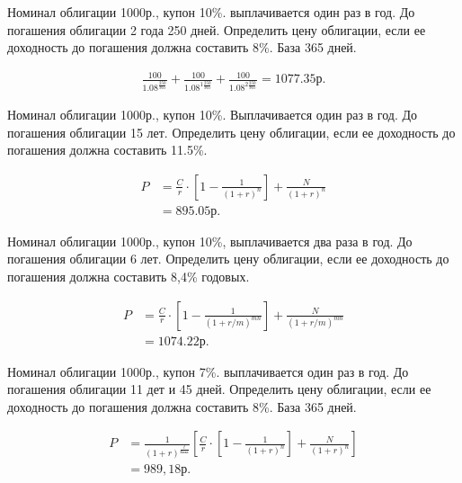 \documentclass[12pt, table, a4paper,twoside]{exam}
\begin{document}
\begin{questions}
\begin{solution}[12em]
\end{solution}



\question[10] Номинал облигации 1000р., купон 10\%. выплачивается один раз в год. До погашения облигации 2 года 250 дней. Определить цену облигации, если ее доходность до погашения должна составить 8\%. База 365 дней.

\begin{solution}[12em]
	\begin{align}
	\frac{100}{1.08^{\frac{250}{365}}} + \frac{100}{1.08^{1\frac{250}{365}}} +\frac{100}{1.08^{2\frac{250}{365}}}=1077.35\text{р.}
	\end{align}
\end{solution}


\question[10] Номинал облигации 1000р., купон 10\%. Выплачивается один раз в год. До погашения облигации 15 лет. Определить цену облигации, если ее доходность до погашения должна составить 11.5\%.

\begin{solution}[12em]
	\begin{align}
	P&=\frac{C}{r} \cdot \left[1- \frac{1}{(1+r)^n} \right] + \frac{N}{(1+r)^n}\\
	&=895.05\text{р.}\nonumber
	\end{align}
\end{solution}


\question[10] Номинал облигации 1000р., купон 10\%, выплачивается два раза в год. До погашения облигации 6 лет. Определить цену облигации, если ее доходность до погашения должна составить 8,4\% годовых.

\begin{solution}[12em]
	\begin{align}
	P&=\frac{C}{r} \cdot \left[1- \frac{1}{(1+r/m)^{mn}} \right] + \frac{N}{(1+r/m)^{mn}}\\
	&=1074.22\text{р.}\nonumber
	\end{align}
\end{solution}


\question[10] Номинал облигации 1000р., купон 7\%. выплачивается один раз в год. До погашения облигации 11 дет и 45 дней. Определить цену облигации, если ее доходность до погашения должна составить 8\%. База 365 дней.

\begin{solution}[12em]
	\begin{align}
	P&=\frac{1}{(1+r)^{\frac{t}{\text{база}}}} \left[\frac{C}{r} \cdot \left[1- \frac{1}{(1+r)^n} \right] + \frac{N}{(1+r)^n} \right]\\
	&=989,18\text{р.}\nonumber
	\end{align}
\end{solution}



\end{questions}
\end{document}
